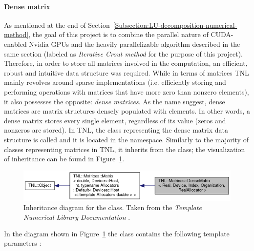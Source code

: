 \paragraph{Dense matrix}\label{Paragraph:implementation-tnl-library-dense-matrix}
As mentioned at the end of Section~\ref{Subsection:LU-decomposition-numerical-method}, the goal of this project is to combine the parallel nature of CUDA-enabled Nvidia GPUs and the heavily parallelizable algorithm described in the same section (labeled as \textit{Iterative Crout method} for the purpose of this project). \\
Therefore, in order to store all matrices involved in the computation, an efficient, robust and intuitive data structure was required. While in terms of matrices TNL mainly revolves around sparse implementations (i.e. efficiently storing and performing operations with matrices that have more zero than nonzero elements), it also possesses the opposite: \textit{dense matrices}. As the name suggest, dense matrices are matrix structures densely populated with elements. In other words, a dense matrix stores every single element, regardless of its value (zeros and nonzeros are stored). In TNL, the class representing the dense matrix data structure is called  and it is located in the  namespace. Similarly to the majority of classes representing matrices in TNL, it inherits from the  class; the visualization of inheritance can be found in Figure~\ref{Figure:implementation-tnl-library-dense-matrix}.

\begin{figure}[ht!]
	\centering
	\includegraphics[width=\textwidth, keepaspectratio]{images/ch2/tnl_matrices_dense_matrix-inheritance.png}
	\caption{Inheritance diagram for the  class. Taken from the \emph{Template Numerical Library Documentation} \cite{Ednu6dyrkWKz1Bv2}.}
	\label{Figure:implementation-tnl-library-dense-matrix}
\end{figure}

In the diagram shown in Figure~\ref{Figure:implementation-tnl-library-dense-matrix} the  class contains the following template parameters \cite{Ednu6dyrkWKz1Bv2}:

